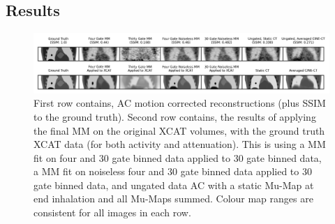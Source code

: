         \subsection{Results} \label{sec:pet_ct_motion_correction_exploiting_motion_models_fit_on_coarsely_gated_data_applied_to_finely_gated_data_results}
            \begin{figure}
                \centering
                
                \includegraphics[width=1.0\linewidth]{figures/motion_correction_2_results_1_visual_analysis.png}
                
                \captionsetup{singlelinecheck=false}
                \caption{
                    First row contains, \gls{AC} motion corrected reconstructions (plus \gls{SSIM} to the ground truth). Second row contains, the results of applying the final \gls{MM} on the original \gls{XCAT} volumes, with the ground truth \gls{XCAT} data (for both activity and attenuation). This is using a \gls{MM} fit on four and $30$ gate binned data applied to $30$ gate binned data, a \gls{MM} fit on noiseless four and $30$ gate binned data applied to $30$ gate binned data, and ungated data \gls{AC} with a static \gls{Mu-Map} at end inhalation and all \glspl{Mu-Map} summed. Colour map ranges are consistent for all images in each row.
                }
                
                \label{fig:pet_ct_motion_correction_exploiting_motion_models_fit_on_coarsely_gated_data_applied_to_finely_gated_data_results_visual_analysis}
            \end{figure}
            

